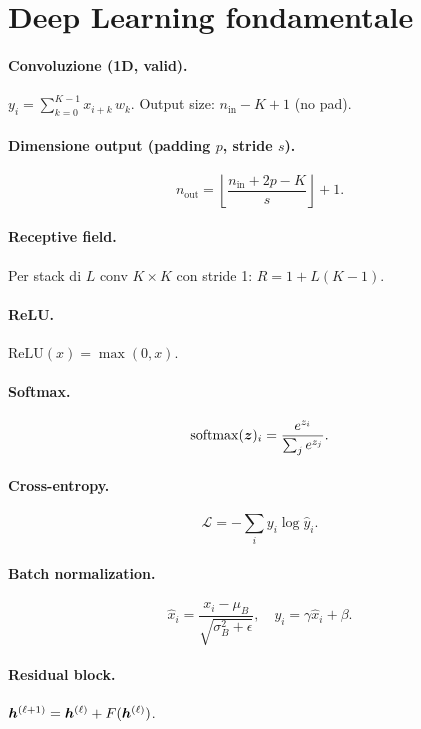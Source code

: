 \section{Deep Learning fondamentale}

\paragraph{Convoluzione (1D, valid).} $y_i = \sum_{k=0}^{K-1} x_{i+k}\, w_k$. Output size: $n_{\text{in}} - K + 1$ (no pad).

\paragraph{Dimensione output (padding $p$, stride $s$).}
\[
n_{\text{out}} = \left\lfloor \frac{n_{\text{in}} + 2p - K}{s}\right\rfloor + 1.
\]

\paragraph{Receptive field.} Per stack di $L$ conv $K\times K$ con stride 1: $R = 1 + L(K-1)$.

\paragraph{ReLU.} $\mathrm{ReLU}(x) = \max(0, x)$.

\paragraph{Softmax.}
\[
\mathrm{softmax}(\bm{z})_i = \frac{e^{z_i}}{\sum_j e^{z_j}}.
\]

\paragraph{Cross-entropy.}
\[
\mathcal{L} = -\sum_i y_i \log \hat y_i.
\]

\paragraph{Batch normalization.}
\[
\hat x_i = \frac{x_i - \mu_B}{\sqrt{\sigma_B^2 + \epsilon}}, \quad y_i = \gamma \hat x_i + \beta.
\]

\paragraph{Residual block.} $\bm{h}^{(\ell+1)} = \bm{h}^{(\ell)} + F(\bm{h}^{(\ell)})$.

